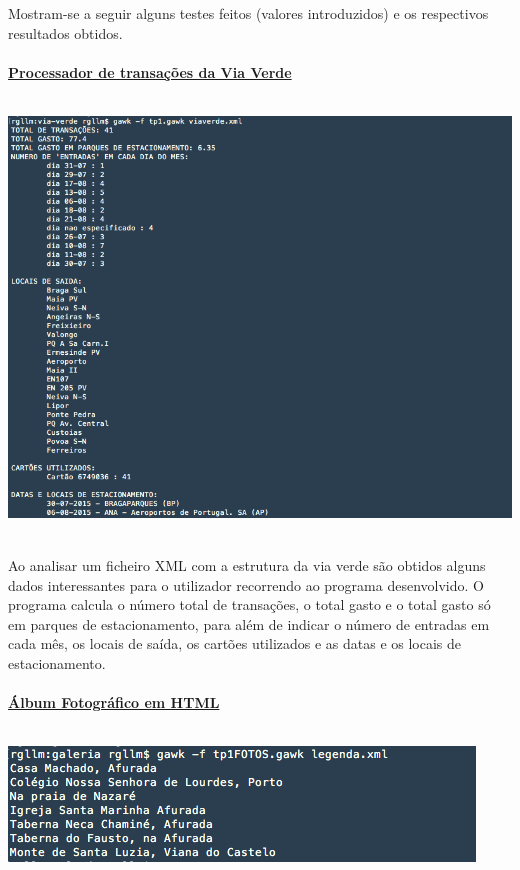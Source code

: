 \documentclass{report}
\begin{document}
Mostram-se a seguir alguns testes feitos (valores introduzidos) e
os respectivos resultados obtidos.
\\
\\
\textbf{\underline{Processador de transações da Via Verde}}
\\
\\
\begin{center}
\includegraphics[scale=0.5]{1}
\end{center}
\\
Ao analisar um ficheiro XML com a estrutura da via verde são obtidos alguns dados interessantes para o utilizador recorrendo ao programa desenvolvido. O programa calcula o número total de transações, o total gasto e o total gasto só em parques de estacionamento, para além de indicar o número de entradas em cada mês, os locais de saída, os cartões utilizados e as datas e os locais de estacionamento.
\\
\\
\textbf{\underline{Álbum Fotográfico em HTML}}
\\
\\
\begin{center}
\includegraphics[scale=1]{2}
\end{center}
\end{document}
